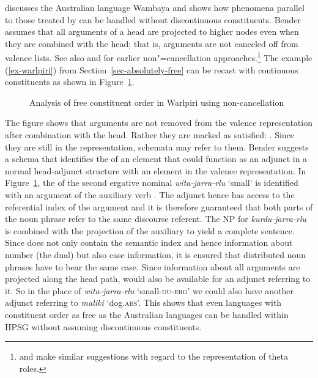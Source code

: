 \documentclass[output=paper
                ,modfonts
                ,nonflat
	        ,collection
	        ,collectionchapter
	        ,collectiontoclongg
 	        ,biblatex
                ,babelshorthands
                ,newtxmath
                ,draftmode
                ,colorlinks, citecolor=brown
]{./langsci/langscibook}
\begin{document}
\citet{Bender2008a} discusses the Australian language Wambaya and shows how phenomena parallel to
those treated by \citet{DS99a} can be handled without discontinuous constituents.
Bender assumes that all arguments of a head are projected to higher nodes even when they are
combined with the head; that is, arguments are not canceled off from valence lists. See also  and
 for earlier non"=cancellation approaches.\footnote{
 and  make similar suggestions with regard to the
representation of theta roles.%
} The example (\ref{ex-warlpiri}) from
Section~\ref{sec-absolutely-free} can be recast with continuous constituents as shown in
Figure~\ref{fig-warlpiri-non-cancellation}. 
\begin{figure}
\caption{\label{fig-warlpiri-non-cancellation}Analysis of free constituent order in Warlpiri using non-cancellation}
\end{figure}
The figure shows that arguments are not removed from the valence representation after combination
with the head. Rather they are marked as satisfied: . Since they are still in the representation,
schemata may refer to them. Bender suggests a schema that identifies the \modv of an element that
could function as an adjunct in a normal head-adjunct structure with an element in the valence
representation. In Figure~\ref{fig-warlpiri-non-cancellation}, the \modv of the second ergative
nominal \emph{wita-jarra-rlu} `small' is identified with an argument of the auxiliary verb . The
adjunct hence has access to the referential index of the argument and it is therefore guaranteed
that both parts of the noun phrase refer to the same discourse referent. The NP for
\emph{kurdu-jarra-rlu} is combined with the projection of the auxiliary to yield a complete
sentence. Since  does not only contain the semantic index and hence information about number
(the dual) but also case information, it is ensured that distributed noun phrases have to bear the
same case. Since information about all arguments are projected along the head path,  would
also be available for an adjunct referring to it. So in the place of \emph{wita-jarra-rlu}
`small-\textsc{du}-\textsc{erg}' we could also have another adjunct referring to \emph{maliki}
`dog.\textsc{abs}'. This shows that even languages with constituent order as free as the Australian
languages can be handled within HPSG without assuming discontinuous constituents.
\end{document}
